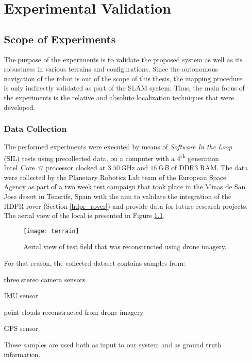 \label{Chapter4}

\newlength\figureheight
\newlength\figurewidth

\chapter{Experimental Validation}

\section{Scope of Experiments}

The purpose of the experiments is to validate the proposed system as
well as its robustness in various terrains and configurations.
Since the autonomous navigation of the robot is out of the scope of this
thesis, the mapping procedure is only indirectly validated as part of the
SLAM system.
Thus, the main focus of the experiments is the relative and absolute
localization techniques that were developed.

\subsection{Data Collection}

The performed experiments were executed by means of
\textit{Software In the Loop} (SIL) tests using precollected data,
on a computer with a 4\textsuperscript{th} generation Intel\textcopyright\
Core\texttrademark\ i7 processor clocked at $\SI{3.50}{\giga\hertz}$ and
$\SI{16}{\giga B}$ of DDR3 RAM.
The data were collected by the Planetary Robotics Lab team of the European
Space Agency as part of a two week test campaign that took
place in the Minas de San Jose desert in Tenerife, Spain with the aim to
validate the integration of the HDPR rover (Section \ref{hdpr_rover}) and
provide data for future research projects.
The aerial view of the local is presented in Figure \ref{fig:terrain}.

\begin{figure}[h!]
    \centering
    \texttt{[image: terrain]}
    \caption[Aerial view of test field]{
        Aerial view of test field that was reconstructed using drone
        imagery.
    }
    \label{fig:terrain}
\end{figure}

For that reason, the collected dataset contains samples from:
\begin{enumerate*}[label=(\roman*)]
        \item three stereo camera sensors
        \item IMU sensor
        \item point clouds reconstructed from drone imagery
        \item GPS sensor.
\end{enumerate*}
These samples are used both as input to our system and as ground truth
information.

